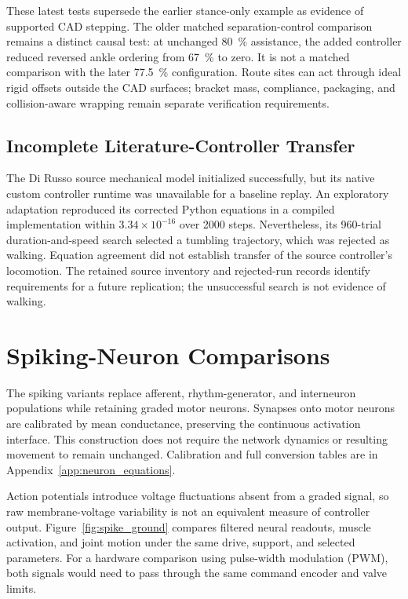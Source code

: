 These latest tests supersede the earlier stance-only example as evidence of supported CAD stepping. The older matched separation-control comparison remains a distinct causal test: at unchanged \qty{80}{\percent} assistance, the added controller reduced reversed ankle ordering from \qty{67}{\percent} to zero. It is not a matched comparison with the later \qty{77.5}{\percent} configuration. Route sites can act through ideal rigid offsets outside the CAD surfaces; bracket mass, compliance, packaging, and collision-aware wrapping remain separate verification requirements.



\subsection{Incomplete Literature-Controller Transfer}\label{sec:app_dirusso_attempt}

The Di Russo source mechanical model initialized successfully, but its native custom controller runtime was unavailable for a baseline replay. An exploratory adaptation reproduced its corrected Python equations in a compiled implementation within $3.34\times10^{-16}$ over 2000 steps. Nevertheless, its 960-trial duration-and-speed search selected a tumbling trajectory, which was rejected as walking. Equation agreement did not establish transfer of the source controller's locomotion. The retained source inventory and rejected-run records identify requirements for a future replication; the unsuccessful search is not evidence of walking.


\section{Spiking-Neuron Comparisons}\label{sec:spiking_methods}\label{sec:spiking_results}\label{sec:disc_spiking}

The spiking variants replace afferent, rhythm-generator, and interneuron populations while retaining graded motor neurons. Synapses onto motor neurons are calibrated by mean conductance, preserving the continuous activation interface. This construction does not require the network dynamics or resulting movement to remain unchanged. Calibration and full conversion tables are in Appendix~\ref{app:neuron_equations}.

Action potentials introduce voltage fluctuations absent from a graded signal, so raw membrane-voltage variability is not an equivalent measure of controller output. Figure~\ref{fig:spike_ground} compares filtered neural readouts, muscle activation, and joint motion under the same drive, support, and selected parameters. For a hardware comparison using pulse-width modulation (PWM), both signals would need to pass through the same command encoder and valve limits.

